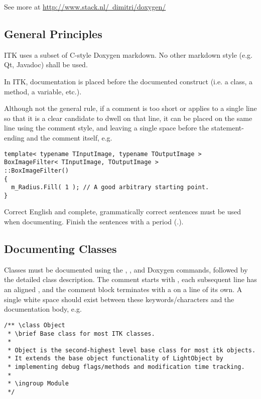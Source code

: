See more at \href{http://www.stack.nl/~dimitri/doxygen/}
{http://www.stack.nl/~dimitri/doxygen/}


\subsection{General Principles}
\label{subsec:GeneralPrinciples}

ITK uses a subset of C-style Doxygen markdown. No other markdown style (e.g. Qt,
Javadoc) shall be used.

In ITK, documentation is placed before the documented construct (i.e. a class, a
method, a variable, etc.).

Although not the general rule, if a comment is too short or applies to a single
line so that it is a clear candidate to dwell on that line, it can be placed on
the same line using the \code{//} comment style, and leaving a single space
before the statement-ending \code{;} and the comment itself, e.g.

\small
\begin{verbatim}
template< typename TInputImage, typename TOutputImage >
BoxImageFilter< TInputImage, TOutputImage >
::BoxImageFilter()
{
  m_Radius.Fill( 1 ); // A good arbitrary starting point.
}
\end{verbatim}
\normalsize

Correct English and complete, grammatically correct sentences must be used
when documenting. Finish the sentences with a period (.).


\subsection{Documenting Classes}
\label{subsec:DocumentingClasses}

Classes must be documented using the ,
, and
 Doxygen commands, followed by the detailed class description.
The comment starts with \code{/**}, each subsequent line has an aligned
\code{*}, and the comment block terminates with a \code{*/} on a line of its
own. A single white space should exist between these keywords/characters and
the documentation body, e.g.

\small
\begin{verbatim}
/** \class Object
 * \brief Base class for most ITK classes.
 *
 * Object is the second-highest level base class for most itk objects.
 * It extends the base object functionality of LightObject by
 * implementing debug flags/methods and modification time tracking.
 *
 * \ingroup Module
 */
\end{verbatim}
\normalsize

